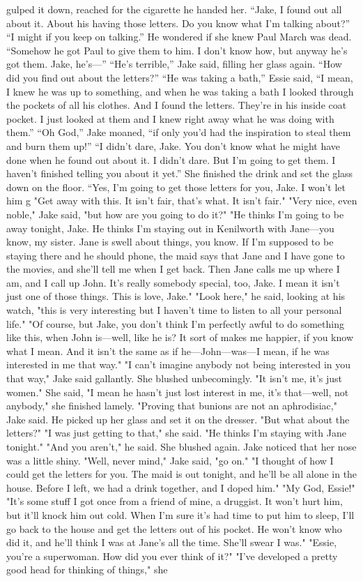 \documentclass{novel}
\begin{document}
gulped it down, reached for the cigarette he handed her. “Jake, I found out all about it. About his having those letters. Do you know what I’m talking about?” “I might if you keep on talking.” He wondered if she knew Paul March was dead. “Somehow he got Paul to give them to him. I don’t know how, but anyway he’s got them. Jake, he’s—” “He’s terrible,” Jake said, filling her glass again. “How did you find out about the letters?” “He was taking a bath,” Essie said, “I mean, I knew he was up to something, and when he was taking a bath I looked through the pockets of all his clothes. And I found the letters. They’re in his inside coat pocket. I just looked at them and I knew right away what he was doing with them.” “Oh God,” Jake moaned, “if only you’d had the inspiration to steal them and burn them up!” “I didn’t dare, Jake. You don’t know what he might have done when he found out about it. I didn’t dare. But I’m going to get them. I haven’t finished telling you about it yet.” She finished the drink and set the glass down on the floor. “Yes, I’m going to get those letters for you, Jake. I won’t let him g "Get away with this. It isn't fair, that's what. It isn't fair." "Very nice, even noble," Jake said, "but how are you going to do it?" "He thinks I'm going to be away tonight, Jake. He thinks I'm staying out in Kenilworth with Jane—you know, my sister. Jane is swell about things, you know. If I'm supposed to be staying there and he should phone, the maid says that Jane and I have gone to the movies, and she'll tell me when I get back. Then Jane calls me up where I am, and I call up John. It's really somebody special, too, Jake. I mean it isn't just one of those things. This is love, Jake." "Look here," he said, looking at his watch, "this is very interesting but I haven't time to listen to all your personal life." "Of course, but Jake, you don't think I'm perfectly awful to do something like this, when John is—well, like he is? It sort of makes me happier, if you know what I mean. And it isn't the same as if he—John—was—I mean, if he was interested in me that way." "I can't imagine anybody not being interested in you that way," Jake said gallantly. She blushed unbecomingly. "It isn't me, it's just women." She said, "I mean he hasn't just lost interest in me, it's that—well, not anybody," she finished lamely. "Proving that bunions are not an aphrodisiac," Jake said. He picked up her glass and set it on the dresser. "But what about the letters?" "I was just getting to that," she said. "He thinks I'm staying with Jane tonight." "And you aren't," he said. She blushed again. Jake noticed that her nose was a little shiny. "Well, never mind," Jake said, "go on." "I thought of how I could get the letters for you. The maid is out tonight, and he'll be all alone in the house. Before I left, we had a drink together, and I doped him." "My God, Essie!" "It's some stuff I got once from a friend of mine, a druggist. It won't hurt him, but it'll knock him out cold. When I'm sure it's had time to put him to sleep, I'll go back to the house and get the letters out of his pocket. He won't know who did it, and he'll think I was at Jane's all the time. She'll swear I was." "Essie, you're a superwoman. How did you ever think of it?" "I've developed a pretty good head for thinking of things," she 
\end{document}
